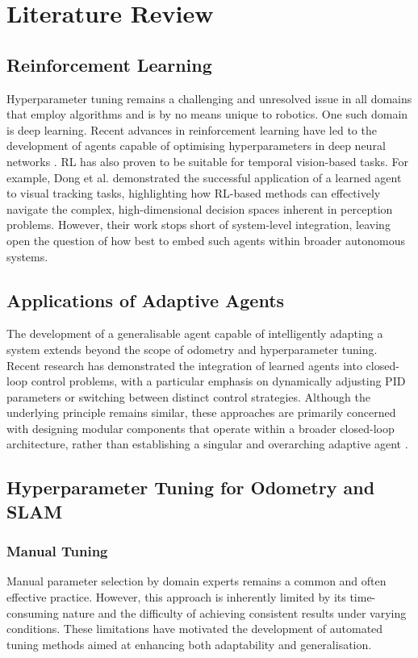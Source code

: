 \documentclass[12pt]{article}
\begin{document}
\section{Literature Review} 


\subsection{Reinforcement Learning}
Hyperparameter tuning remains a challenging and unresolved issue in all domains that employ algorithms and is by no means unique to robotics. One such domain is deep learning. Recent advances in reinforcement learning have led to the development of agents capable of optimising hyperparameters in deep neural networks \cite{jomaa_2019_hyprl}. RL has also proven to be suitable for temporal vision-based tasks. For example, Dong et al. \cite{dong_2019_dynamical} demonstrated the successful application of a learned agent to visual tracking tasks, highlighting how RL-based methods can effectively navigate the complex, high-dimensional decision spaces inherent in perception problems. However, their work stops short of system-level integration, leaving open the question of how best to embed such agents within broader autonomous systems.

\subsection{Applications of Adaptive Agents}
The development of a generalisable agent capable of intelligently adapting a system extends beyond the scope of odometry and hyperparameter tuning. Recent research has demonstrated the integration of learned agents into closed-loop control problems, with a particular emphasis on dynamically adjusting PID parameters or switching between distinct control strategies. Although the underlying principle remains similar, these approaches are primarily concerned with designing modular components that operate within a broader closed-loop architecture, rather than establishing a singular and overarching adaptive agent \cite{gao_2023_online, carlucho_2019_double}.

\subsection{Hyperparameter Tuning for Odometry and SLAM}

\subsubsection{Manual Tuning}
Manual parameter selection by domain experts remains a common and often effective practice. However, this approach is inherently limited by its time-consuming nature and the difficulty of achieving consistent results under varying conditions. These limitations have motivated the development of automated tuning methods aimed at enhancing both adaptability and generalisation.
\end{document}
